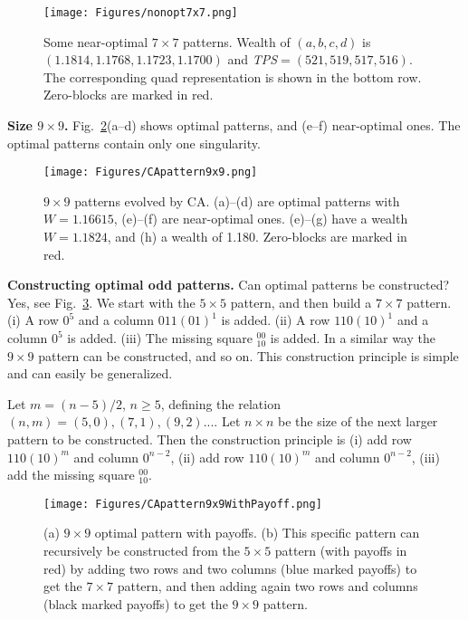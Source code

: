 \documentclass[10pt,a4paper]{article}  %
\begin{document}
\begin{figure}[H] 
\centering
\texttt{[image: Figures/nonopt7x7.png]}	
\caption{
Some near-optimal $7 \times 7$ patterns.
Wealth of $(a, b, c, d)$ is $(1.1814, 1.1768, 1.1723, 1.1700)$
and \textit{TPS}$ = (521, 519, 517, 516)$. 
The corresponding quad representation is shown in the bottom row. 
Zero-blocks are marked in red.
}
\label{nonopt7x7}
\end{figure}


\textbf{Size $9\times 9$.}
Fig.~\ref{CApattern9x9}(a--d) shows optimal patterns,
and (e--f) near-optimal ones. 
The optimal patterns contain only one singularity. 

\begin{figure}[H] 
\centering
\texttt{[image: Figures/CApattern9x9.png]}	
\caption{
$9 \times 9$ patterns evolved by CA. 
(a)--(d) are optimal patterns with $W=1.16615$,
(e)--(f) are near-optimal ones. 
(e)--(g) have a wealth $W= 1.1824$, and (h) a wealth of  1.180.
Zero-blocks are marked in red.
}
\label{CApattern9x9}
\end{figure}

\textbf{Constructing optimal odd patterns.}
Can optimal patterns be constructed? Yes, see Fig.~\ref{CApattern9x9WithPayoff}.
We start with the $5\times5$ pattern, and then build a $7\times7$ pattern.
(i) A row  $0^5$   and a column $011(01)^1$ is added.
(ii) A row $110(10)^1$  and a column $0^5$ is added.
(iii) The missing square $^{00}_{10}$ is added. 
In a similar way the $9\times9$ pattern can be constructed, and so on. 
This construction principle is simple and can easily be generalized. 

Let $m=(n-5)/2$, $n \geq 5$, 
defining the relation $(n,m)= (5,0), (7,1), (9,2) ...$.
Let $n \times n$ be the size of the next larger pattern to be constructed.
Then the construction principle is
%
(i) add row $110(10)^m$  and column $0^{n-2}$,
(ii) add row $110(10)^m$  and column $0^{n-2}$, 
(iii) add the missing square $^{00}_{10}$. 


\begin{figure}[H] 
\centering
\texttt{[image: Figures/CApattern9x9WithPayoff.png]}	
\caption{
(a) $9 \times 9$ optimal pattern with payoffs. 
(b) This specific pattern can recursively be constructed from 
the $5\times 5$ pattern (with payoffs in red) by adding 
two rows and two columns (blue marked payoffs) to get
the $7\times 7$ pattern, and then adding again two rows and columns 
(black marked payoffs) to get
the $9\times 9$ pattern.
}
\label{CApattern9x9WithPayoff}
\end{figure}
\end{document}
